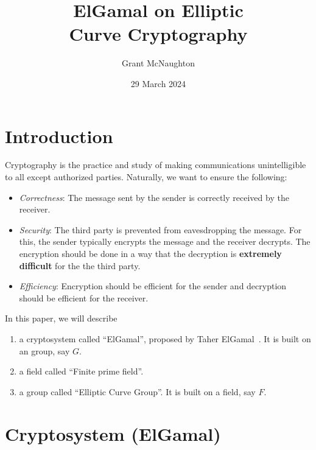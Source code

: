 \documentclass{article}%
\begin{document}
\title{ElGamal on Elliptic\\Curve Cryptography}
\author{Grant McNaughton}
\date{29 March 2024}
\maketitle

\section{Introduction}

Cryptography is the practice and study of making communications unintelligible to all except authorized parties. Naturally, we want to ensure the following:

\begin{itemize}
\item \emph{Correctness}: The message sent by the sender is correctly received
by the receiver.

\item \emph{Security}: The third party is prevented from eavesdropping the
message. For this, the sender typically encrypts the message and the receiver
decrypts. The encryption should be done in a way that the decryption is
\textbf{extremely difficult} for the the third party.

\item \emph{Efficiency}: Encryption should be efficient for the sender and
decryption should be efficient for the receiver.
\end{itemize}

\noindent In this paper, we will describe

\begin{enumerate}
\item a cryptosystem called \textquotedblleft ElGamal\textquotedblright,
proposed by Taher ElGamal~\cite{1985_ElGamal}. It is built on an group, say
$G$.

\item a field called \textquotedblleft Finite prime field\textquotedblright.

\item a group called \textquotedblleft Elliptic Curve Group\textquotedblright.
It is built on a field, say $F$.
\end{enumerate}

\section{Cryptosystem (ElGamal)}
\end{document}
